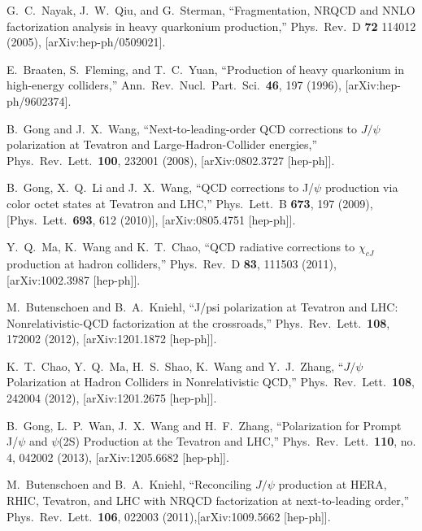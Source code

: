 \documentclass[aps,prc,preprint,superscriptaddress,showpacs,showkeys,amsmath]{revtex4-1}
\begin{document}
\begin{thebibliography}{100}
 G.~C.~Nayak, J.~W.~Qiu, and G.~Sterman,
 ``Fragmentation, NRQCD and NNLO factorization analysis in heavy  quarkonium production,''
 Phys.\ Rev.\  D {\bf 72} 114012 (2005),
 [arXiv:hep-ph/0509021].


  E.~Braaten, S.~Fleming, and T.~C.~Yuan,
  ``Production of heavy quarkonium in high-energy colliders,''
  Ann.\ Rev.\ Nucl.\ Part.\ Sci.\  {\bf 46}, 197 (1996),
  [arXiv:hep-ph/9602374].



  B.~Gong and J.~X.~Wang,
  ``Next-to-leading-order QCD corrections to $J/\psi$ polarization at Tevatron and Large-Hadron-Collider energies,''
  Phys.\ Rev.\ Lett.\  {\bf 100}, 232001 (2008),
  [arXiv:0802.3727 [hep-ph]].
  

  B.~Gong, X.~Q.~Li and J.~X.~Wang,
  ``QCD corrections to J/$\psi$ production via color octet states at Tevatron and LHC,''
  Phys.\ Lett.\ B {\bf 673}, 197 (2009),
  [Phys.\ Lett.\  {\bf 693}, 612 (2010)],
  [arXiv:0805.4751 [hep-ph]].
  
  Y.~Q.~Ma, K.~Wang and K.~T.~Chao,
  ``QCD radiative corrections to $\chi_{cJ}$ production at hadron colliders,''
  Phys.\ Rev.\ D {\bf 83}, 111503 (2011),
  [arXiv:1002.3987 [hep-ph]].




  M.~Butenschoen and B.~A.~Kniehl,
  ``J/psi polarization at Tevatron and LHC: Nonrelativistic-QCD factorization at the crossroads,''
  Phys.\ Rev.\ Lett.\  {\bf 108}, 172002 (2012),
  [arXiv:1201.1872 [hep-ph]].
  
  K.~T.~Chao, Y.~Q.~Ma, H.~S.~Shao, K.~Wang and Y.~J.~Zhang,
  ``$J/\psi$ Polarization at Hadron Colliders in Nonrelativistic QCD,''
  Phys.\ Rev.\ Lett.\  {\bf 108}, 242004 (2012),
  [arXiv:1201.2675 [hep-ph]].
  
  B.~Gong, L.~P.~Wan, J.~X.~Wang and H.~F.~Zhang,
  ``Polarization for Prompt J/$\psi$ and $\psi$(2S) Production at the Tevatron and LHC,''
  Phys.\ Rev.\ Lett.\  {\bf 110}, no. 4, 042002 (2013),
  [arXiv:1205.6682 [hep-ph]].
 
  M.~Butenschoen and B.~A.~Kniehl,
  ``Reconciling $J/\psi$ production at HERA, RHIC, Tevatron, and LHC with NRQCD factorization at next-to-leading order,''
  Phys.\ Rev.\ Lett.\  {\bf 106}, 022003 (2011),[arXiv:1009.5662 [hep-ph]].
 


\end{thebibliography}
\end{document}
